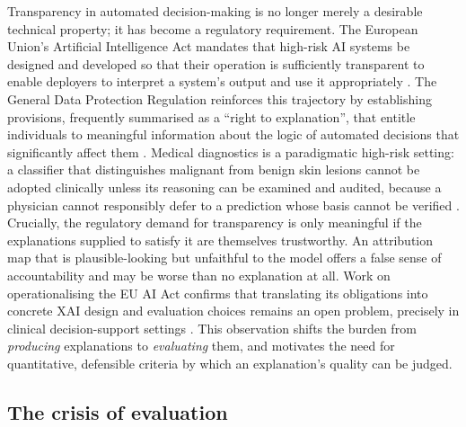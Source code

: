Transparency in automated decision-making is no longer merely a desirable
technical property; it has become a regulatory requirement. The European Union's
Artificial Intelligence Act mandates that high-risk AI systems be designed and
developed so that their operation is sufficiently transparent to enable
deployers to interpret a system's output and use it appropriately
\cite{eu2024aiact}. The General Data Protection Regulation reinforces this
trajectory by establishing provisions, frequently summarised as a
``right to explanation'', that entitle individuals to meaningful information
about the logic of automated decisions that significantly affect them
\cite{eu2016gdpr}. Medical diagnostics is a paradigmatic high-risk setting: a
classifier that distinguishes malignant from benign skin lesions cannot be
adopted clinically unless its reasoning can be examined and audited, because a
physician cannot responsibly defer to a prediction whose basis cannot be
verified \cite{sangwan2024quantifying}. Crucially, the regulatory demand for
transparency is only meaningful if the explanations supplied to satisfy it are
themselves trustworthy. An attribution map that is plausible-looking but
unfaithful to the model offers a false sense of accountability and may be worse
than no explanation at all. Work on operationalising the EU AI Act confirms
that translating its obligations into concrete XAI design and evaluation
choices remains an open problem, precisely in clinical decision-support
settings \citep{hummel2026bidirectional}. This observation shifts the burden from
\emph{producing} explanations to \emph{evaluating} them, and motivates the need
for quantitative, defensible criteria by which an explanation's quality can be
judged.

\subsection{The crisis of evaluation}


